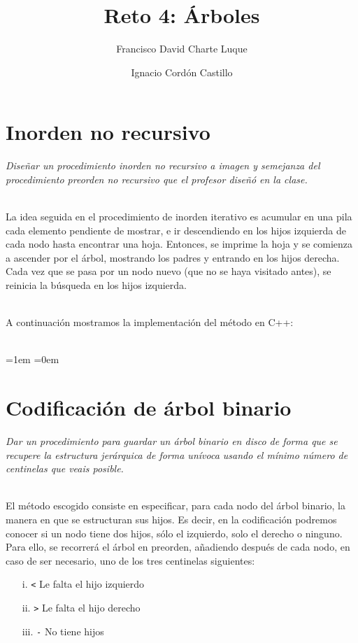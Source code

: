 \documentclass[a4paper,10pt]{scrartcl}
\title{Reto 4: Árboles}
\author{Francisco David Charte Luque\and
        Ignacio Cordón Castillo}
\date{}
\begin{document}
\maketitle
\section{Inorden no recursivo}
        \textit{Diseñar un procedimiento inorden no recursivo a imagen y semejanza
        del procedimiento preorden no recursivo que el profesor diseñó en la clase.}\\\
 
 La idea seguida en el procedimiento de inorden iterativo es acumular en una pila
 cada elemento pendiente de mostrar, e ir descendiendo en los hijos izquierda de cada nodo
 hasta encontrar una hoja. Entonces, se imprime la hoja y se comienza a ascender
 por el árbol, mostrando los padres y entrando en los hijos derecha. Cada vez que se pasa por un
 nodo nuevo (que no se haya visitado antes), se reinicia la búsqueda en los hijos izquierda.\\\
 
 A continuación mostramos la implementación del método en C++:\\\
 
 \leftskip=1em
 \small
 \texttt{}
 \normalsize
 \leftskip=0em
 
 \section{Codificación de árbol binario}
         \textit{Dar un procedimiento para guardar un árbol binario en disco de forma que se
         recupere la estructura jerárquica de forma unívoca usando el mínimo número
         de centinelas que veais posible.}\\\
 
 
 El método escogido consiste en especificar, para cada nodo del árbol binario, 
 la manera en que se estructuran sus hijos. Es decir, en la codificación 
 podremos conocer si un nodo tiene dos hijos, sólo el
 izquierdo, solo el derecho o ninguno. Para ello, se recorrerá el árbol en preorden,
 añadiendo después de cada nodo, en caso de ser necesario, uno
 de los tres centinelas siguientes:
  
 \begin{enumerate}
 \item[i.] \texttt{<} Le falta el hijo izquierdo
 \item[ii.] \texttt{>} Le falta el hijo derecho
 \item[iii.] \texttt{-} No tiene hijos
 \end{enumerate}
 
\end{document}
